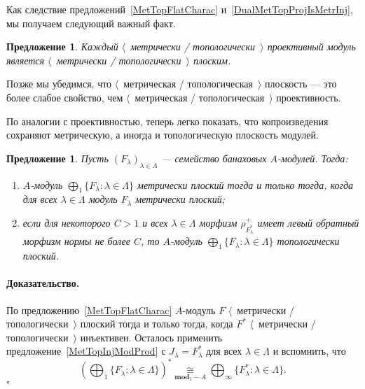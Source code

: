 \documentclass[12pt]{article}
\newcommand{\isom}[1]{\mathop{\mathbin{\cong}}\limits_{#1}}
\newtheorem{proposition}[theorem]{Предложение}
\renewenvironment{proof}{\paragraph{Доказательство.}}{\hfill$\square$\medskip}
\begin{document}
Как следствие предложений~\ref{MetTopFlatCharac}
и~\ref{DualMetTopProjIsMetrInj}, мы получаем следующий важный факт.

\begin{proposition}\label{MetTopProjIsMetTopFlat} Каждый $\langle$~метрически /
    топологически~$\rangle$ проективный модуль является $\langle$~метрически /
    топологически~$\rangle$ плоским.
\end{proposition}

Позже мы убедимся, что $\langle$~метрическая / топологическая~$\rangle$
плоскость --- это более слабое свойство, чем $\langle$~метрическая /
топологическая~$\rangle$ проективность.

По аналогии с проективностью, теперь легко показать, что копроизведения
сохраняют метрическую, а иногда и топологическую плоскость модулей.

\begin{proposition}\label{MetTopFlatModCoProd} Пусть
    ${(F_\lambda)}_{\lambda\in\Lambda}$ --- семейство банаховых $A$-модулей.
    Тогда:
    \begin{enumerate}[label = (\roman*)]
        \item $A$-модуль $\bigoplus_1 \{F_\lambda:\lambda\in\Lambda \}$ метрически
              плоский тогда и только тогда, когда для всех $\lambda\in\Lambda$ модуль
              $F_\lambda$ метрически плоский;

        \item если для некоторого $C>1$ и всех $\lambda\in\Lambda$ морфизм
              $\rho_{F_\lambda^*}^+$ имеет левый обратный морфизм нормы не более $C$, то
              $A$-модуль $\bigoplus_1 \{F_\lambda:\lambda\in\Lambda \}$ топологически
              плоский.
    \end{enumerate}

\end{proposition}
\begin{proof} По предложению~\ref{MetTopFlatCharac} $A$-модуль $F$
    $\langle$~метрически / топологически~$\rangle$ плоский тогда и только тогда,
    когда $F^*$ $\langle$~метрически / топологически~$\rangle$ инъективен.
    Осталось применить предложение~\ref{MetTopInjModProd} с
    $J_\lambda=F_\lambda^*$ для всех $\lambda\in\Lambda$ и вспомнить, что
    $$
        {\left(\bigoplus\nolimits_1 \{ F_\lambda:\lambda\in\Lambda \}\right)}^*
        \isom{\mathbf{mod}_1-A}
        \bigoplus\nolimits_\infty \{ F_\lambda^*:\lambda\in\Lambda \}.
    $$
\end{proof}
\end{document}
